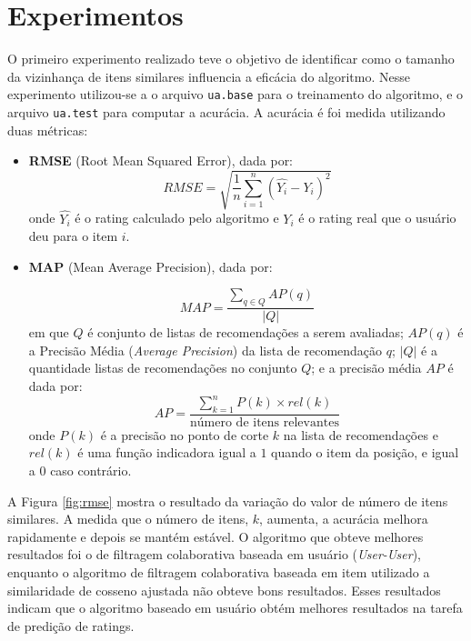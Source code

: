 \documentclass[12pt, a4paper, oneside]{article}
\begin{document}
\section{Experimentos}
\label{sec:experimentos}

O primeiro experimento realizado teve o objetivo de identificar como o tamanho da vizinhança de itens similares
influencia a eficácia do algoritmo. Nesse experimento utilizou-se a o arquivo \texttt{ua.base} para o
treinamento do algoritmo, e o arquivo \texttt{ua.test} para computar a acurácia.
A acurácia é foi medida utilizando duas métricas:
\begin{itemize}
\item \textbf{RMSE} (Root Mean Squared Error), dada por:
$$ RMSE = \sqrt{ \frac{1}{n}\sum_{i=1}^n(\hat{Y_i} - Y_i)^2} $$
onde $\hat{Y_i}$ é o rating calculado pelo algoritmo e $Y_i$ é o rating real que o usuário deu para o item $i$.
\item \textbf{MAP} (Mean Average Precision), dada por:

$$ MAP = \frac{ \sum\limits_{q \in Q} AP(q) }{ |Q| }$$
em que $Q$ é conjunto de listas de recomendações a serem avaliadas; $AP(q)$ é a Precisão Média (\textit{Average Precision}) da lista de recomendação $q$; $|Q|$ é a quantidade listas de recomendações no conjunto $Q$; e a precisão média $AP$ é dada por:
$$ AP = \frac{ \sum\limits_{k=1}^n P(k) \times rel(k) }{ \mbox{número de itens relevantes}} $$
onde $P(k)$ é a precisão no ponto de corte $k$ na lista de recomendações e $rel(k)$ é uma função indicadora igual a $1$ quando o item da posição, e igual a $0$ caso contrário.
\end{itemize}

A Figura \ref{fig:rmse} mostra o resultado da variação do valor de número de itens similares. A medida que o número de itens, $k$, aumenta, a acurácia melhora rapidamente e depois se mantém estável. O algoritmo que obteve melhores resultados foi o de filtragem colaborativa baseada em usuário (\textit{User-User}), enquanto o algoritmo de filtragem colaborativa baseada em item utilizado a similaridade de cosseno ajustada não obteve bons resultados. Esses resultados indicam que o algoritmo baseado em usuário obtém melhores resultados na tarefa de predição de ratings.

\end{document}
